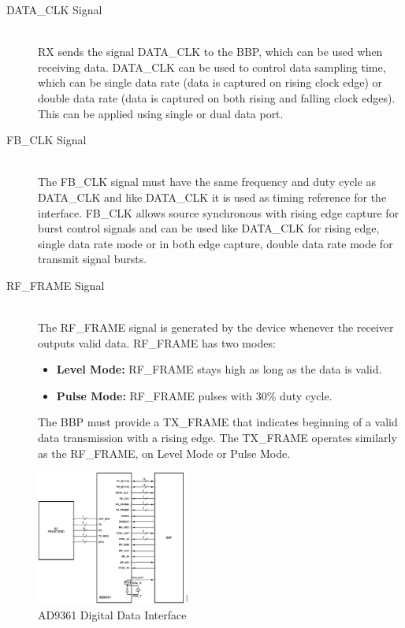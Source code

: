 \begin{description}
	\item[DATA\_CLK Signal] \hfill \\
	 RX sends the signal DATA\_CLK to the BBP, which can be used when receiving data.
   DATA\_CLK can be used to control data sampling time, which can be single data
   rate (data is captured on rising clock edge) or double data rate (data is
   captured on both rising and falling clock edges). This can be applied using
   single or dual data port.

	\item[FB\_CLK Signal] \hfill \\
	The FB\_CLK signal must have the same frequency and duty cycle as DATA\_CLK and
	like DATA\_CLK it is used as timing reference for the interface. FB\_CLK allows
	source synchronous with rising edge capture for burst control signals and can
	be used like DATA\_CLK for rising edge, single data rate mode or in both edge
	capture, double data rate mode for transmit signal bursts.

	\item[RF\_FRAME Signal] \hfill \\
	The RF\_FRAME signal is generated by the device whenever the receiver outputs
	valid data. RF\_FRAME has two modes:
	\begin{itemize}
		\item \textbf{Level Mode:} RF\_FRAME stays high as long as the data is valid.
		\item \textbf{Pulse Mode:} RF\_FRAME pulses with 30\% duty cycle.
	\end{itemize}
	The BBP must provide a TX\_FRAME that indicates beginning of a valid data
	transmission with a rising edge. The TX\_FRAME operates similarly as the
	RF\_FRAME, on Level Mode or Pulse Mode.

\end{description}

\begin{figure}[htbp]
    \centering
    \includegraphics[width=0.45\textwidth]{./figures/ad9361_digital_interface}
    \caption{ AD9361 Digital Data Interface
    \label{fig:ad9361diginterface}}
\end{figure}


